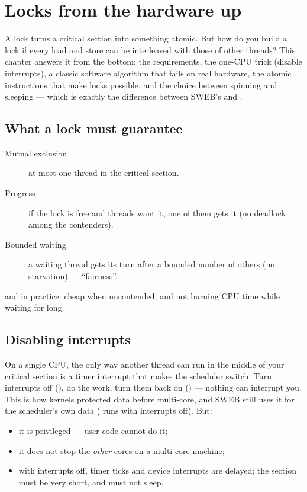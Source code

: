 \chapter{Locks from the hardware up}
\label{ch:locks}

A lock turns a critical section into something atomic. But how do you
build a lock if every load and store can be interleaved with those of
other threads? This chapter answers it from the bottom: the requirements,
the one-CPU trick (disable interrupts), a classic software algorithm that
fails on real hardware, the atomic instructions that make locks possible,
and the choice between spinning and sleeping --- which is exactly the
difference between SWEB's  and .

\section{What a lock must guarantee}

\begin{description}
  \item[Mutual exclusion] at most one thread in the critical section.
  \item[Progress] if the lock is free and threads want it, one of them
    gets it (no deadlock among the contenders).
  \item[Bounded waiting] a waiting thread gets its turn after a bounded
    number of others (no starvation) --- ``fairness''.
\end{description}
and in practice: cheap when uncontended, and not burning CPU time while
waiting for long.

\section{Disabling interrupts}

On a single CPU, the only way another thread can run in the middle of
your critical section is a timer interrupt that makes the scheduler
switch. Turn interrupts off (), do the work, turn them back on
() --- nothing can interrupt you. This is how kernels protected
data before multi-core, and SWEB still uses it for the scheduler's own
data ( runs with interrupts off). But:
\begin{itemize}
  \item it is privileged --- user code cannot do it;
  \item it does not stop the \emph{other} cores on a multi-core machine;
  \item with interrupts off, timer ticks and device interrupts are
    delayed; the section must be very short, and must not sleep.
\end{itemize}

